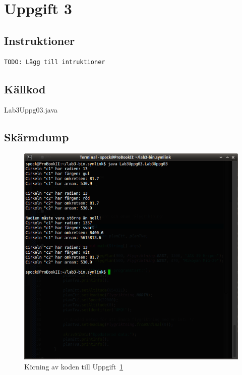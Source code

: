 \section{Uppgift 3}\label{sec:uppg03}

\subsection{Instruktioner}
\begin{verbatim}
TODO: Lägg till intruktioner
\end{verbatim}


\subsection{Källkod}
\caption{Lab3Uppg03.java}
\label{src:uppg03}


\subsection{Skärmdump}
\begin{figure}[htbp]
    \centering
        \includegraphics[width=\linewidth]{img/03.png}
    \caption{Körning av koden till Uppgift~\ref{sec:uppg03}}
    \label{fig:uppg03-screenshot}
\end{figure}

